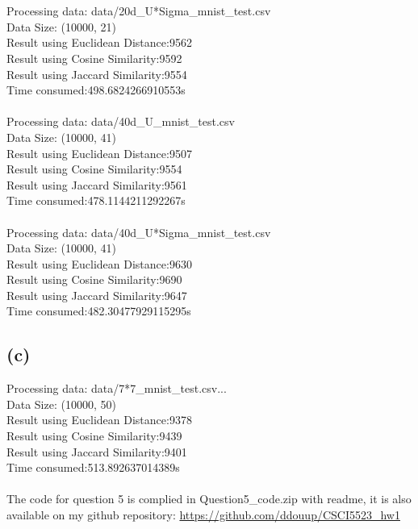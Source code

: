 \documentclass[a4paper]{article}
\begin{document}
\\
\\Processing data: data/20d\_U*Sigma\_mnist\_test.csv
\\Data Size: (10000, 21)
\\Result using Euclidean Distance:9562
\\Result using Cosine Similarity:9592
\\Result using Jaccard Similarity:9554
\\Time consumed:498.6824266910553s
\\
\\Processing data: data/40d\_U\_mnist\_test.csv
\\Data Size: (10000, 41)
\\Result using Euclidean Distance:9507
\\Result using Cosine Similarity:9554
\\Result using Jaccard Similarity:9561
\\Time consumed:478.1144211292267s
\\
\\Processing data: data/40d\_U*Sigma\_mnist\_test.csv
\\Data Size: (10000, 41)
\\Result using Euclidean Distance:9630
\\Result using Cosine Similarity:9690
\\Result using Jaccard Similarity:9647
\\Time consumed:482.30477929115295s
\subsection{(c)}
Processing data: data/7*7\_mnist\_test.csv...
\\Data Size: (10000, 50)
\\Result using Euclidean Distance:9378
\\Result using Cosine Similarity:9439
\\Result using Jaccard Similarity:9401
\\Time consumed:513.892637014389s
\\
\\The code for question 5 is complied in Question5\_code.zip with readme, it is also available on my github repository: 
\url{https://github.com/ddouup/CSCI5523_hw1}
\end{document}
